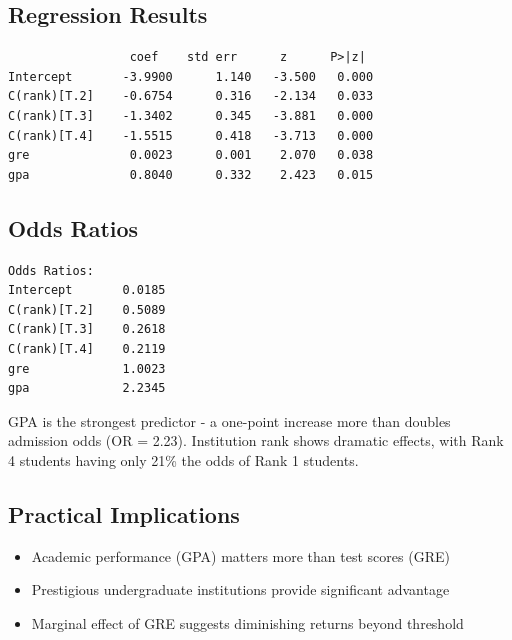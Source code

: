 \documentclass[12pt, a4paper]{article}
\begin{document}
\subsection*{Regression Results}

\begin{outputbox}
\begin{verbatim}
                 coef    std err      z      P>|z|
Intercept       -3.9900      1.140   -3.500   0.000
C(rank)[T.2]    -0.6754      0.316   -2.134   0.033
C(rank)[T.3]    -1.3402      0.345   -3.881   0.000
C(rank)[T.4]    -1.5515      0.418   -3.713   0.000
gre              0.0023      0.001    2.070   0.038
gpa              0.8040      0.332    2.423   0.015
\end{verbatim}
\end{outputbox}

\subsection*{Odds Ratios}

\begin{outputbox}
\begin{verbatim}
Odds Ratios:
Intercept       0.0185
C(rank)[T.2]    0.5089
C(rank)[T.3]    0.2618
C(rank)[T.4]    0.2119
gre             1.0023
gpa             2.2345
\end{verbatim}
\end{outputbox}

\begin{insightbox}
GPA is the strongest predictor - a one-point increase more than doubles admission odds (OR = 2.23). Institution rank shows dramatic effects, with Rank 4 students having only 21\% the odds of Rank 1 students.
\end{insightbox}

\subsection*{Practical Implications}

\begin{itemize}
    \item Academic performance (GPA) matters more than test scores (GRE)
    \item Prestigious undergraduate institutions provide significant advantage
    \item Marginal effect of GRE suggests diminishing returns beyond threshold
\end{itemize}
\end{document}
